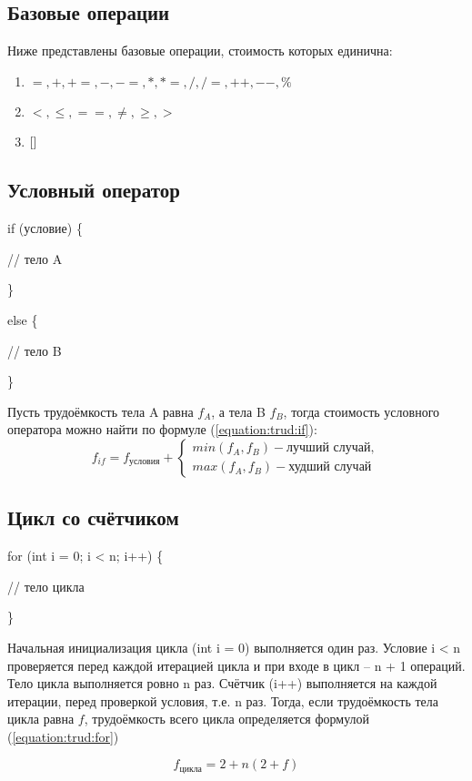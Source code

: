         \subsection{Базовые операции}
            Ниже представлены базовые операции, стоимость которых единична:
            \begin{enumerate}
                \item $ =, +, +=, -, -=, *, *=,  /, /=, ++, --, \% $
                \item $ <, \leqslant, ==, \neq, \geqslant , > $
                \item $ [ \space ] $
            \end{enumerate}
            
        \subsection{Условный оператор}
            if (условие) \{

                // тело A

            \}

            else \{

                // тело B
            
            \}

            Пусть трудоёмкость тела A равна $ f_A $, а тела B $ f_B $, тогда
            стоимость условного оператора можно найти по формуле (\ref{equation:trud:if}):
            \begin{equation}
                f_{if} = f_\text{условия} + \left\{
                    \begin{matrix}
                    min(f_A, f_B) - \text{лучший случай},\\
                    max(f_A, f_B) - \text{худший случай} 
                    \end{matrix}\right.
                \label{equation:trud:if}
            \end{equation}

        \subsection{Цикл со счётчиком}
            for (int i = 0; i < n; i++) \{

                // тело цикла

            \}
            
            Начальная инициализация цикла (int i = 0) выполняется один раз.
            Условие i < n проверяется перед каждой итерацией цикла и при входе в цикл -- n + 1 операций.
            Тело цикла выполняется ровно n раз.
            Счётчик (i++) выполняется на каждой итерации, перед проверкой условия, т.е. n раз.
            Тогда, если трудоёмкость тела цикла равна $ f $, трудоёмкость всего цикла определяется формулой (\ref{equation:trud:for})

            \begin{equation}
                f_\text{цикла} = 2 + n(2 + f)
                \label{equation:trud:for}
            \end{equation}

\newpage